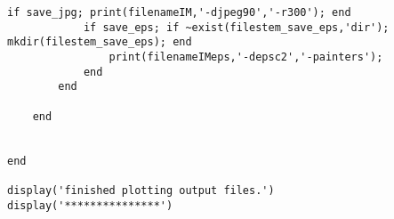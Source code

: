 \begin{lstlisting}[breaklines]
            if save_jpg; print(filenameIM,'-djpeg90','-r300'); end
            if save_eps; if ~exist(filestem_save_eps,'dir'); mkdir(filestem_save_eps); end
                print(filenameIMeps,'-depsc2','-painters'); 
            end
        end
        
    end
    
    
end

display('finished plotting output files.')
display('***************')
\end{lstlisting}